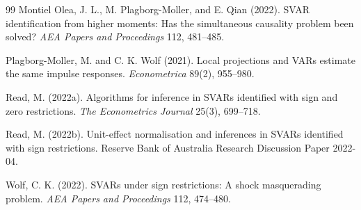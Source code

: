\documentclass[11pt]{article}
\theoremstyle{definition}
\theoremstyle{plain}
\theoremstyle{remark}
\begin{document}
\begin{thebibliography}{99}
Montiel Olea, J. L., M. Plagborg-Moller, and E. Qian (2022).
SVAR identification from higher moments: Has the simultaneous causality problem
been solved? \emph{AEA Papers and Proceedings} 112, 481--485.

Plagborg-Moller, M. and C. K. Wolf (2021).
Local projections and VARs estimate the same impulse responses.
\emph{Econometrica} 89(2), 955--980.

Read, M. (2022a).
Algorithms for inference in SVARs identified with sign and zero restrictions.
\emph{The Econometrics Journal} 25(3), 699--718.

Read, M. (2022b).
Unit-effect normalisation and inferences in SVARs identified with sign
restrictions. Reserve Bank of Australia Research Discussion Paper 2022-04.

Wolf, C. K. (2022).
SVARs under sign restrictions: A shock masquerading problem. \emph{AEA Papers
and Proceedings} 112, 474--480.
\end{thebibliography}
\end{document}
